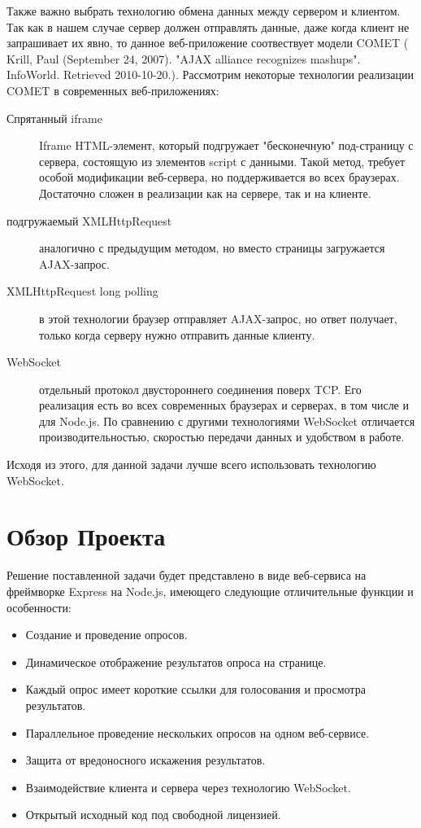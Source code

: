Также важно выбрать технологию обмена данных между сервером и клиентом. Так как в нашем случае сервер должен отправлять данные, даже когда клиент не запрашивает их явно, то данное веб-приложение соотвествует модели COMET ( Krill, Paul (September 24, 2007). "AJAX alliance recognizes mashups". InfoWorld. Retrieved 2010-10-20.). Рассмотрим некоторые технологии реализации COMET в современных веб-приложениях:

\begin{description}
	\item[Спрятанный iframe] Iframe HTML-элемент, который подгружает "бесконечную" под-страницу с сервера, состоящую из элементов script с данными. Такой метод, требует особой модификации веб-сервера, но поддерживается во всех браузерах. Достаточно сложен в реализации как на сервере, так и на клиенте. 
	\item[подгружаемый XMLHttpRequest] аналогично с предыдущим методом, но вместо страницы загружается AJAX-запрос.
	\item[XMLHttpRequest long polling] в этой технологии браузер отправляет AJAX-запрос, но ответ получает, только когда серверу нужно отправить данные клиенту. 
	\item[WebSocket] отдельный протокол двустороннего соединения поверх TCP. Его реализация есть во всех современных браузерах и серверах, в том числе и для Node.js. По сравнению с другими технологиями WebSocket отличается производительностью, скоростью передачи данных и удобством в работе.
\end{description}
Исходя из этого, для данной задачи лучше всего использовать технологию WebSocket.

 
\section{Обзор Проекта}
Решение поставленной задачи будет представлено в виде веб-сервиса на фреймворке Express на Node.js, имеющего следующие отличительные функции и особенности:
 \begin{itemize}
	\item Создание и проведение опросов. 
	\item Динамическое отображение результатов опроса на странице.
	\item Каждый опрос имеет короткие ссылки для голосования и просмотра результатов.
	\item Параллельное проведение нескольких опросов на одном веб-сервисе.
	\item Защита от вредоносного искажения результатов. 
	\item Взаимодействие клиента и сервера через технологию WebSocket.
	\item Открытый исходный код под свободной лицензией.
\end{itemize} 
 
